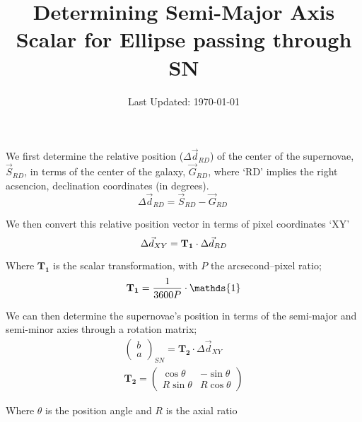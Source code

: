 \documentclass[a4paper]{article}
\title{Determining Semi-Major Axis Scalar for Ellipse passing through SN}
\author{}
\date{Last Updated: \today}
\begin{document}
  \pagestyle{fancy} \lhead{} \rhead{}
  \maketitle

\noindent We first determine the relative position ($\Delta\vec{d}_{RD}$) of the center of the supernovae,
$\vec{S}_{RD}$, in terms of the center of the galaxy, $\vec{G}_{RD}$, where `RD'
implies the right acsencion, declination coordinates (in degrees).
    \begin{equation}
    \Delta\vec{d}_{RD} = \vec{S}_{RD} - \vec{G}_{RD}\
    \end{equation}

\noindent We then convert this relative position vector in terms of pixel coordinates `XY'
    \begin{equation}
    \Delta\vec{d}_{XY} = \mathbf{T_1}\cdot\Delta\vec{d}_{RD}\\
    \end{equation}

\noindent Where $\mathbf{T_1}$ is the scalar transformation, with $P$ the
arcsecond--pixel ratio;
    \begin{equation}
    \mathbf{T_1} = \frac{1}{3600P}\cdot\mathds{1}\\
    \end{equation}

\noindent We can then determine the supernovae's position in terms of the semi-major and
semi-minor axies through a rotation matrix;
\begin{subequations}
    \begin{align}
    \begin{pmatrix}b\\a\end{pmatrix}_{SN}=\mathbf{T_2}\cdot\Delta\vec{d}_{XY}\\
    \mathbf{T_2} = \begin{pmatrix}\cos\theta&-\sin\theta\\ R\sin\theta&R\cos\theta\end{pmatrix}
    \end{align}
\end{subequations}

\noindent Where $\theta$ is the position angle and $R$ is the axial ratio
\end{document}
